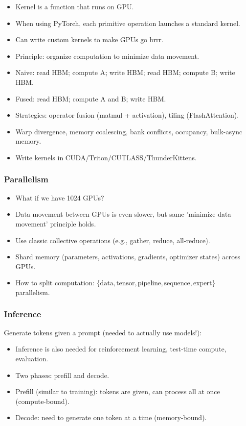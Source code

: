 \documentclass[12pt,twoside]{article}
\begin{document}
\begin{itemize}
    \item Kernel is a function that runs on GPU.
    \item When using PyTorch, each primitive operation launches a standard kernel.
    \item Can write custom kernels to make GPUs go brrr.
    \item Principle: organize computation to minimize data movement.
    \item Naive: read HBM; compute A; write HBM; read HBM; compute B; write HBM.
    \item Fused: read HBM; compute A and B; write HBM.
    \item Strategies: operator fusion (matmul + activation), tiling (FlashAttention).
    \item Warp divergence, memory coalescing, bank conflicts, occupancy, bulk-async memory.
    \item Write kernels in CUDA/Triton/CUTLASS/ThunderKittens.
\end{itemize}

\subsubsection*{Parallelism}

\begin{itemize}
    \item What if we have 1024 GPUs?
    \item Data movement between GPUs is even slower, but same 'minimize data movement' principle holds.
    \item Use classic collective operations (e.g., gather, reduce, all-reduce).
    \item Shard memory (parameters, activations, gradients, optimizer states) across GPUs.
    \item How to split computation: \(\{\text{data}, \text{tensor}, \text{pipeline}, \text{sequence}, \text{expert}\}\) parallelism.
\end{itemize}

\subsubsection*{Inference}

Generate tokens given a prompt (needed to actually use models!):

\begin{itemize}
    \item Inference is also needed for reinforcement learning, test-time compute, evaluation.
    \item Two phases: prefill and decode.
    \item Prefill (similar to training): tokens are given, can process all at once (compute-bound).
    \item Decode: need to generate one token at a time (memory-bound).
\end{itemize}
\end{document}
